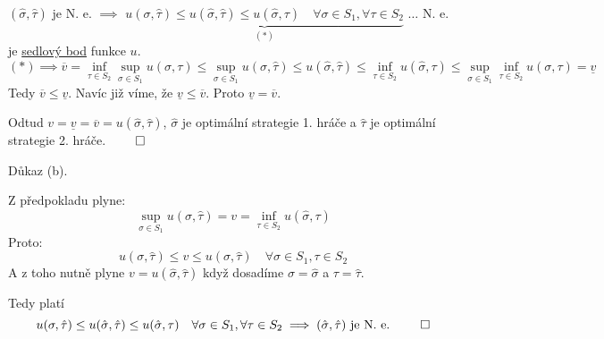 $(\hat \sigma, \hat \tau)$ je N. e. $\implies$ 
$\underbrace{u(\sigma, \hat \tau) \leq u(\hat \sigma, \hat \tau) \leq u(\hat\sigma, \tau) \quad \forall \sigma \in S_1, 
\forall \tau \in S_2}_{(*)}$ $\dots$ N. e. je \hyperref[sedl]{sedlový bod} funkce $u$.
\[
    (*) \implies \overline{v} = \inf_{\tau \in S_2} \sup_{\sigma \in S_1} u(\sigma, \tau) \leq 
    \sup_{\sigma \in S_1} u(\sigma, \hat \tau) \leq u(\hat \sigma, \hat \tau) \leq 
    \inf_{\tau \in S_2} u(\hat\sigma, \tau) \leq
    \sup_{\sigma \in S_1} \inf_{\tau \in S_2} u(\sigma, \tau) = \underline{v}
\]
Tedy $\overline{v} \leq \underline{v}$. Navíc již víme, že $\underline{v} \leq \overline{v}$. 
Proto $\underline{v} = \overline{v}$.

Odtud $v = \underline{v} = \overline{v} = u(\hat \sigma, \hat \tau)$, $\hat \sigma$ je optimální strategie 1. hráče a 
$\hat \tau$ je optimální strategie 2. hráče. $\qed$

Důkaz (b).

Z předpokladu plyne: 
\[  
    \sup_{\sigma \in S_1} u(\sigma, \hat \tau) = v = \inf_{\tau \in S_2} u(\hat \sigma, \tau)
\]
Proto:
\[
    u(\sigma, \hat \tau) \leq v \leq u(\sigma, \hat \tau) \quad \forall \sigma \in S_1, \tau \in S_2
\]
A z toho nutně plyne $v = u(\hat \sigma, \hat \tau)$ když dosadíme $\sigma = \hat \sigma$ a $\tau = \hat \tau$. 

Tedy platí 
\[
    u(\sigma, \hat \tau) \leq u(\hat \sigma, \hat \tau) \leq u(\hat\sigma, \tau) \quad \forall \sigma \in S_1, 
    \forall \tau \in S_2 \implies (\hat \sigma, \hat \tau) \text{ je N. e. } \qed
\]
